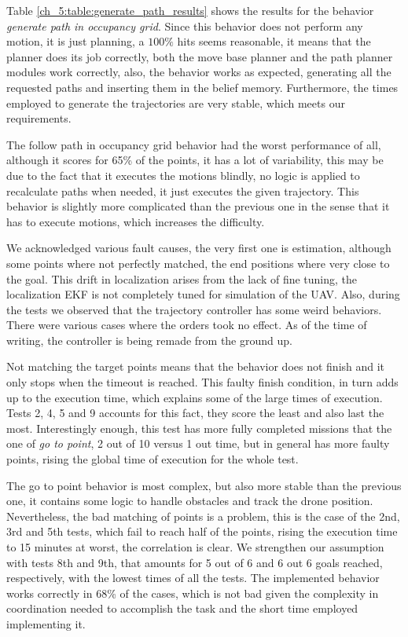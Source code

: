   

  Table \ref{ch_5:table:generate_path_results} shows the results for the behavior \textit{generate path in occupancy grid}. Since this behavior does not perform any motion, it is just planning, a $100\%$ hits seems reasonable, it means that the planner does its job correctly, both the move base planner and the path planner modules work correctly, also, the behavior works as expected, generating all the requested paths and inserting them in the belief memory. Furthermore, the times employed to generate the trajectories are very stable, which meets our requirements. 

  

  The follow path in occupancy grid behavior had the worst performance of all, although it scores for 65\% of the points, it has a lot of variability, this may be due to the fact that it executes the motions blindly, no logic is applied to recalculate paths when needed, it just executes the given trajectory. This behavior is slightly more complicated than the previous one in the sense that it has to execute motions, which increases the difficulty.

  We acknowledged various fault causes, the very first one is estimation, although some points where not perfectly matched, the end positions where very close to the goal. This drift in localization arises from the lack of fine tuning, the localization EKF is not completely tuned for simulation of the UAV. Also, during the tests we observed that the trajectory controller has some weird behaviors. There were various cases where the orders took no effect. As of the time of writing, the controller is being remade from the ground up.

  Not matching the target points means that the behavior does not finish and it only stops when the timeout is reached. This faulty finish condition, in turn adds up to the execution time, which explains some of the large times of execution. Tests 2, 4, 5 and 9 accounts for this fact, they score the least and also last the most. Interestingly enough, this test has more fully completed missions that the one of \textit{go to point}, 2 out of 10 versus 1 out time, but in general has more faulty points, rising the global time of execution for the whole test.

  

  The go to point behavior is most complex, but also more stable than the previous one, it contains some logic to handle obstacles and track the drone position. Nevertheless, the bad matching of points is a problem, this is the case of the 2nd, 3rd and 5th tests, which fail to reach half of the points, rising the execution time to 15 minutes at worst, the correlation is clear. We strengthen our assumption with tests 8th and 9th, that amounts for 5 out of 6 and 6 out 6 goals reached, respectively, with the lowest times of all the tests. The implemented behavior works correctly in 68\% of the cases, which is not bad given the complexity in coordination needed to accomplish the task and the short time employed implementing it.

